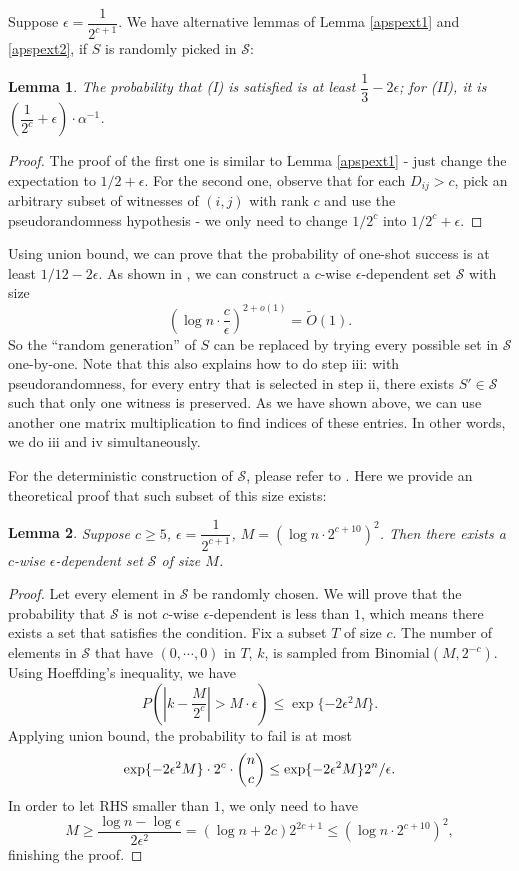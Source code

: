 \documentclass[11pt]{article}
\theoremstyle{plain}
\newtheorem{lemma}{Lemma}[section]
\begin{document}
Suppose $\epsilon=\dfrac{1}{2^{c+1}}$. We have alternative lemmas of Lemma \ref{apspext1} and \ref{apspext2}, if $S$ is randomly picked in $\mathcal{S}$:

\begin{lemma}
\label{apspext4}
The probability that (I) is satisfied is at least $\dfrac{1}{3}-2\epsilon$; for (II), it is $(\dfrac{1}{2^c}+\epsilon)\cdot \alpha^{-1}$.
\end{lemma}

\begin{proof}
The proof of the first one is similar to Lemma \ref{apspext1} - just change the expectation to $1/2+\epsilon$. For the second one, observe that for each $D_{ij}>c$, pick an arbitrary subset of witnesses of $(i,j)$ with rank $c$ and use the pseudorandomness hypothesis - we only need to change $1/2^c$ into $1/2^c+\epsilon$.
\end{proof}

Using union bound, we can prove that the probability of one-shot success is at least $1/12-2\epsilon$. As shown in \cite{10.1145/100216.100244}, we can construct a $c$-wise $\epsilon$-dependent set $\mathcal{S}$ with size
$$(\log n\cdot\dfrac{c}{\epsilon})^{2+o(1)}=\tilde O(1).$$
So the ``random generation'' of $S$ can be replaced by trying every possible set in $\mathcal{S}$ one-by-one. Note that this also explains how to do step iii: with pseudorandomness, for every entry that is selected in step ii, there exists $S'\in \mathcal{S}$ such that only one witness is preserved. As we have shown above, we can use another one matrix multiplication to find indices of these entries. In other words, we do iii and iv simultaneously.

For the deterministic construction of $\mathcal{S}$, please refer to \cite{10.1145/100216.100244}. Here we provide an theoretical proof that such subset of this size exists:

\begin{lemma}
\label{psr1}
Suppose $c\ge 5$, $\epsilon=\dfrac{1}{2^{c+1}}$, $M=(\log n\cdot 2^{c+10})^2$. Then there exists a $c$-wise $\epsilon$-dependent set $\mathcal{S}$ of size $M$.
\end{lemma}

\begin{proof}
Let every element in $\mathcal{S}$ be randomly chosen. We will prove that the probability that $\mathcal{S}$ is not $c$-wise $\epsilon$-dependent is less than $1$, which means there exists a set that satisfies the condition. Fix a subset $T$ of size $c$. The number of elements in $\mathcal{S}$ that have $(0,\cdots,0)$ in $T$, $k$, is sampled from $\text{Binomial}(M,2^{-c})$. Using Hoeffding's inequality, we have
$$P(|k-\dfrac{M}{2^{c}}|>M\cdot \epsilon) \le \exp\{-2\epsilon^2 M\}.$$
Applying union bound, the probability to fail is at most
$$\exp\{-2\epsilon^2 M\}\cdot 2^c\cdot \dbinom{n}{c}\le \exp\{-2\epsilon^2M\}2^n/\epsilon.$$
In order to let RHS smaller than $1$, we only need to have
$$M\ge \dfrac{\log n-\log \epsilon}{2\epsilon^2}=(\log n+2c)2^{2c+1}\le (\log n\cdot 2^{c+10})^2,$$
finishing the proof.
\end{proof}
\end{document}
